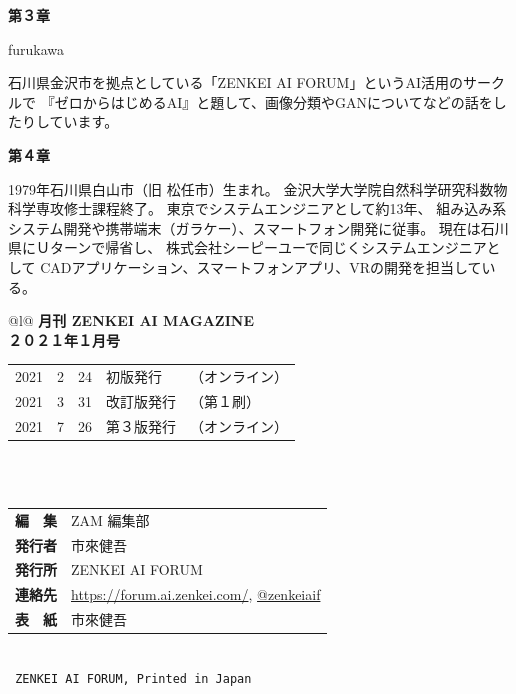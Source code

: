 \documentclass[dvipdfmx,autodetect-engine,10pt,b5paper,papersize,openany,dvipsnames]{jsbook}
\newcommand{\bhline}[1]{\noalign{\hrule height #1}}
\begin{document}
\noindent
{\gtfamily\bfseries \Large 第３章}

\noindent
{\large furukawa}

石川県金沢市を拠点としている「ZENKEI AI FORUM」というAI活用のサークルで
『ゼロからはじめるAI』と題して、画像分類やGANについてなどの話をしたりしています。


\vspace{1em}

\noindent
{\gtfamily\bfseries \Large 第４章}

\noindent
{\large {}}

1979年石川県白山市（旧 松任市）生まれ。
金沢大学大学院自然科学研究科数物科学専攻修士課程終了。
東京でシステムエンジニアとして約13年、
組み込み系システム開発や携帯端末（ガラケー）、スマートフォン開発に従事。
現在は石川県にＵターンで帰省し、
株式会社シーピーユーで同じくシステムエンジニアとして
CADアプリケーション、スマートフォンアプリ、VRの開発を担当している。


\newpage

\vspace*{\fill}

\begin{flushleft}
  \begin{tabular*}{\textwidth}{@{}l@{\extracolsep{\fill}}}
    \textbf{\LARGE 月刊 ZENKEI AI MAGAZINE}\\
    \textbf{\Large ２０２１年１月号}\\
    \bhline{1pt}
    \begin{tabular}{@{}r@{年\kern.5zw}r@{月\kern.5zw}r@{日\kern1.5zw}ll}
      2021 & 2 & 24 & 初版発行 & （オンライン）\\
      2021 & 3 & 31 & 改訂版発行 & （第１刷）\\
      2021 & 7 & 26 & 第３版発行 & （オンライン）\\
    \end{tabular} \\
    \\
    \begin{tabular}{@{}l@{\kern.5zw\textbf{:}\kern1zw}l}
      \textbf{編　集} & ZAM 編集部\\
      \textbf{発行者} & 市來健吾\\
      \textbf{発行所} & ZENKEI AI FORUM\\
      \textbf{連絡先} & \url{https://forum.ai.zenkei.com/}, \href{https://twitter.com/zenkeiaif}{@zenkeiaif} \\
      \textbf{表　紙} & 市來健吾\\
    \end{tabular} \\
    \bhline{1pt}
    \texttt{%
      \textcopyright\quad
      ZENKEI AI FORUM,\quad
      Printed in Japan
    }
  \end{tabular*}
\end{flushleft}
\end{document}
